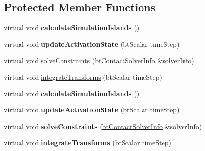 \subsection*{Protected Member Functions}
\begin{DoxyCompactItemize}
\item 
\mbox{\label{classbtMultiBodyDynamicsWorld_a65bee9648fc52d04658334539b1df759}} 
virtual void {\bfseries calculate\+Simulation\+Islands} ()
\item 
\mbox{\label{classbtMultiBodyDynamicsWorld_a14f75ed5c93f4b90b442ef5b54f52c1d}} 
virtual void {\bfseries update\+Activation\+State} (bt\+Scalar time\+Step)
\item 
virtual void \hyperlink{classbtMultiBodyDynamicsWorld_a96ca0256c11525090a831cc854fe0750}{solve\+Constraints} (\hyperlink{structbtContactSolverInfo}{bt\+Contact\+Solver\+Info} \&solver\+Info)
\item 
virtual void \hyperlink{classbtMultiBodyDynamicsWorld_a6abe9896c6178b8d5bebdbca53fa7a74}{integrate\+Transforms} (bt\+Scalar time\+Step)
\item 
\mbox{\label{classbtMultiBodyDynamicsWorld_aaad7786c260722728d9f79aecaced910}} 
virtual void {\bfseries calculate\+Simulation\+Islands} ()
\item 
\mbox{\label{classbtMultiBodyDynamicsWorld_abbd60bb2d3cc26e77a30cdd03b3340c2}} 
virtual void {\bfseries update\+Activation\+State} (bt\+Scalar time\+Step)
\item 
\mbox{\label{classbtMultiBodyDynamicsWorld_acd6ffc86a8867a5618d7e0ef2f57d8e4}} 
virtual void {\bfseries solve\+Constraints} (\hyperlink{structbtContactSolverInfo}{bt\+Contact\+Solver\+Info} \&solver\+Info)
\item 
\mbox{\label{classbtMultiBodyDynamicsWorld_a74b2c2e0322187dc3a306df7905acd0b}} 
virtual void {\bfseries integrate\+Transforms} (bt\+Scalar time\+Step)
\end{DoxyCompactItemize}
